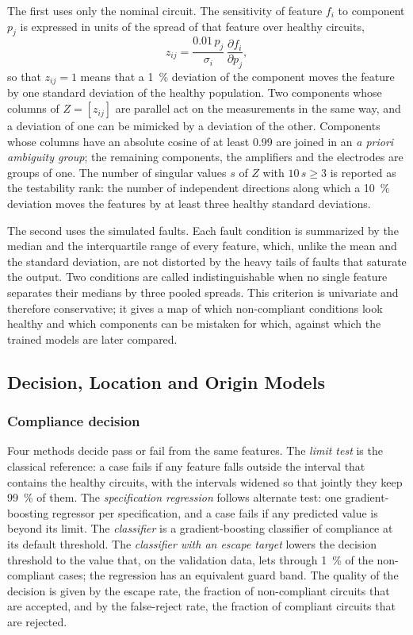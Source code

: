 The first uses only the nominal circuit. The sensitivity of feature $f_i$ to component $p_j$ is
expressed in units of the spread of that feature over healthy circuits,
\begin{equation}
z_{ij} = \frac{0.01\,p_j}{\sigma_i}\,\frac{\partial f_i}{\partial p_j},
\label{eq:sensitivity}
\end{equation}
so that $z_{ij}=1$ means that a \SI{1}{\percent} deviation of the component moves the feature by
one standard deviation of the healthy population. Two components whose columns of
$Z=[z_{ij}]$ are parallel act on the measurements in the same way, and a deviation of one can be
mimicked by a deviation of the other. Components whose columns have an absolute cosine of at
least 0.99 are joined in an \emph{a priori ambiguity group}; the remaining components, the
amplifiers and the electrodes are groups of one. The number of singular values $s$ of $Z$ with
$10\,s\ge 3$ is reported as the testability rank: the number of independent directions along
which a \SI{10}{\percent} deviation moves the features by at least three healthy standard
deviations.

The second uses the simulated faults. Each fault condition is summarized by the median and the
interquartile range of every feature, which, unlike the mean and the standard deviation, are not
distorted by the heavy tails of faults that saturate the output. Two conditions are called
indistinguishable when no single feature separates their medians by three pooled spreads. This
criterion is univariate and therefore conservative; it gives a map of which non-compliant
conditions look healthy and which components can be mistaken for which, against which the trained
models are later compared.

\subsection{Decision, Location and Origin Models}
\label{sec:models}

\subsubsection{Compliance decision}
Four methods decide pass or fail from the same features. The \emph{limit test} is the classical
reference: a case fails if any feature falls outside the interval that contains the healthy
circuits, with the intervals widened so that jointly they keep \SI{99}{\percent} of them. The
\emph{specification regression} follows alternate test: one gradient-boosting regressor per
specification, and a case fails if any predicted value is beyond its limit. The
\emph{classifier} is a gradient-boosting classifier of compliance at its default threshold. The
\emph{classifier with an escape target} lowers the decision threshold to the value that, on the
validation data, lets through \SI{1}{\percent} of the non-compliant cases; the regression has an
equivalent guard band. The quality of the decision is given by the escape rate, the fraction of
non-compliant circuits that are accepted, and by the false-reject rate, the fraction of compliant
circuits that are rejected.

